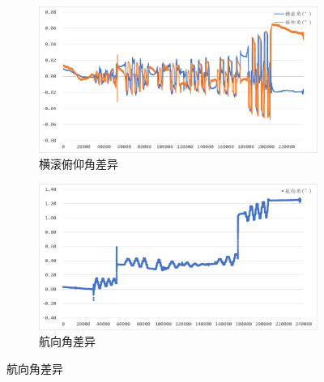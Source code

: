 \documentclass[10pt,a4paper]{ctexart}
\begin{document}
\begin{figure}[H]
    \centering
    {
        \begin{subfigure}{0.49\textwidth}
            \centering
            \includegraphics[width=\linewidth]{Figures/DataFigure/灵素修正横滚俯仰角差异.png}
            \caption*{横滚俯仰角差异}
        \end{subfigure}\hfill
        \begin{subfigure}{0.49\textwidth}
            \centering
            \includegraphics[width=\linewidth]{Figures/DataFigure/灵素修正航向角差异.png}
            \caption*{航向角差异}
        \end{subfigure}
        
}
\end{figure}
\end{document}
